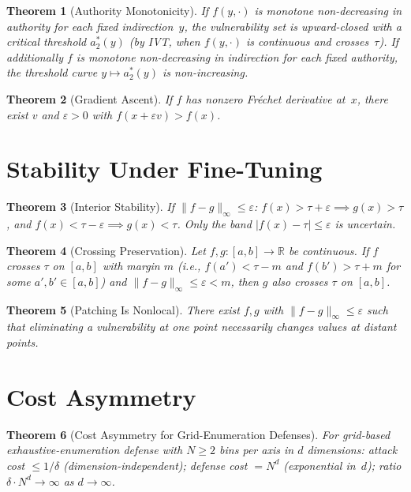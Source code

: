 \documentclass[11pt]{article}
\newtheorem{theorem}{Theorem}[section]
\newcommand{\R}{\mathbb{R}}
\begin{document}
\begin{theorem}[Authority Monotonicity]
\label{thm:authority}
If $f(y,\cdot)$ is monotone non-decreasing in authority for each fixed
indirection~$y$, the vulnerability set is upward-closed with a critical
threshold $a^*_2(y)$ (by IVT, when $f(y,\cdot)$ is continuous and
crosses~$\tau$). If additionally $f$ is monotone non-decreasing in
indirection for each fixed authority, the threshold curve
$y \mapsto a^*_2(y)$ is non-increasing.
\end{theorem}

\begin{theorem}[Gradient Ascent]
\label{thm:gradient}
If $f$ has nonzero Fr\'{e}chet derivative at~$x$, there exist $v$ and
$\varepsilon > 0$ with $f(x + \varepsilon v) > f(x)$.
\end{theorem}


\section{Stability Under Fine-Tuning}
\label{app:stability}

\begin{theorem}[Interior Stability]
\label{thm:interior-stable}
If $\|f - g\|_\infty \leq \varepsilon$:
$f(x) > \tau + \varepsilon \implies g(x) > \tau$, and
$f(x) < \tau - \varepsilon \implies g(x) < \tau$.
Only the band $|f(x) - \tau| \leq \varepsilon$ is uncertain.
\end{theorem}

\begin{theorem}[Crossing Preservation]
\label{thm:crossing}
Let $f, g\colon [a,b] \to \R$ be continuous. If $f$ crosses $\tau$
on $[a,b]$ with margin $m$ (i.e., $f(a') < \tau - m$ and
$f(b') > \tau + m$ for some $a', b' \in [a,b]$) and
$\|f - g\|_\infty \leq \varepsilon < m$, then $g$ also crosses
$\tau$ on $[a,b]$.
\end{theorem}

\begin{theorem}[Patching Is Nonlocal]
\label{thm:nonlocal}
There exist $f, g$ with $\|f-g\|_\infty \leq \varepsilon$ such that
eliminating a vulnerability at one point necessarily changes values at
distant points.
\end{theorem}


\section{Cost Asymmetry}
\label{app:cost}

\begin{theorem}[Cost Asymmetry for Grid-Enumeration Defenses]
\label{thm:cost}
For \emph{grid-based exhaustive-enumeration} defense with $N \geq 2$
bins per axis in $d$ dimensions:
attack cost $\leq 1/\delta$ (dimension-independent); defense cost
$= N^d$ (exponential in~$d$); ratio
$\delta \cdot N^d \to \infty$ as $d\to\infty$.
\end{theorem}
\end{document}
